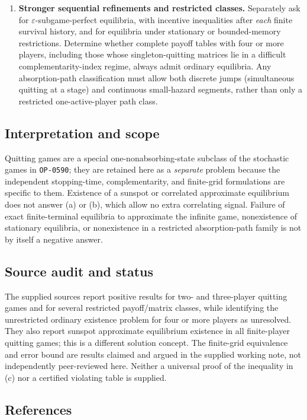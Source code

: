 \documentclass[11pt,a4paper]{article}
\newcommand{\Problemref}[1]{\texttt{#1}}
\begin{document}
\begin{enumerate}[label=\textbf{(\alph*)},leftmargin=2.5em]
	\item \textbf{Stronger sequential refinements and restricted classes.}
	Separately ask for $\varepsilon$-subgame-perfect equilibria, with
	incentive inequalities after \emph{each} finite survival history,
	and for equilibria under stationary or bounded-memory restrictions.
	Determine whether complete payoff tables with four or more players,
	including those whose singleton-quitting matrices lie in a difficult
	complementarity-index regime, always admit ordinary equilibria.
	Any absorption-path classification must allow both discrete jumps
	(simultaneous quitting at a stage) and continuous small-hazard
	segments, rather than only a restricted one-active-player path class.
\end{enumerate}

\subsection*{Interpretation and scope}

Quitting games are a special one-nonabsorbing-state subclass of the
stochastic games in \Problemref{OP-0590}; they are retained here as a
\emph{separate} problem because the independent stopping-time,
complementarity, and finite-grid formulations are specific to them.
Existence of a sunspot or correlated approximate equilibrium does not
answer (a) or (b), which allow no extra correlating signal. Failure of
exact finite-terminal equilibria to approximate the infinite game,
nonexistence of stationary equilibria, or nonexistence in a restricted
absorption-path family is not by itself a negative answer.

\subsection*{Source audit and status}

The supplied sources report positive results for two- and three-player
quitting games and for several restricted payoff/matrix classes, while
identifying the unrestricted ordinary existence problem for four or
more players as unresolved. They also report sunspot approximate
equilibrium existence in all finite-player quitting games; this is a
different solution concept. The finite-grid equivalence and error
bound are results claimed and argued in the supplied working note,
not independently peer-reviewed here. Neither a universal proof of
the inequality in (c) nor a certified violating table is supplied.

\subsection*{References}
\end{document}

